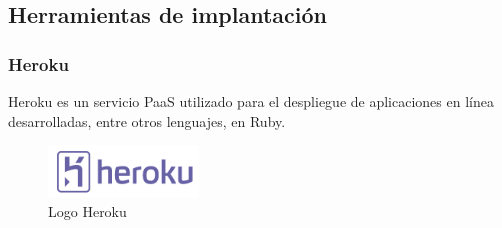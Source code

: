 	\subsection{Herramientas de implantación}
		\subsubsection{Heroku}
		\label{subsubsection:heroku}
		Heroku es un servicio \ac{PaaS} utilizado para el despliegue de aplicaciones en línea desarrolladas, entre otros lenguajes, en Ruby.
				
		\begin{figure}[H]
		\centering
		\includegraphics[width=40mm, fbox={\fboxrule} 4mm]{images/04-metodo/37-heroku_logo.png}
		\caption{Logo Heroku}
		\label{fig:heroku-logo}
		\end{figure}
	

